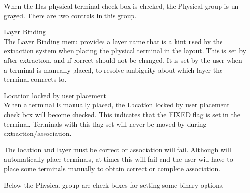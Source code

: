 When the {\cb Has physical terminal} check box is checked, the {\cb
Physical} group is un-grayed.  There are two controls in this group. 

\begin{description}
\item{\cb Layer Binding}\\
The {\cb Layer Binding} menu provides a layer name that is a hint used
by the extraction system when placing the physical terminal in the
layout.  This is set by {\Xic} after extraction, and if correct should
not be changed.  It is set by the user when a terminal is manually
placed, to resolve ambiguity about which layer the terminal connects
to.

\item{\cb Location locked by user placement}\\
When a terminal is manually placed, the {\cb Location locked by user
placement} check box will become checked.  This indicates that the
{\et FIXED} flag is set in the terminal.  Terminals with this flag set
will never be moved by {\Xic} during extraction/association. 
\end{description}

The location and layer must be correct or association will fail. 
Although {\Xic} will automatically place terminals, at times this will
fail and the user will have to place some terminals manually to obtain
correct or complete association.

Below the {\cb Physical} group are check boxes for setting some binary
options.

